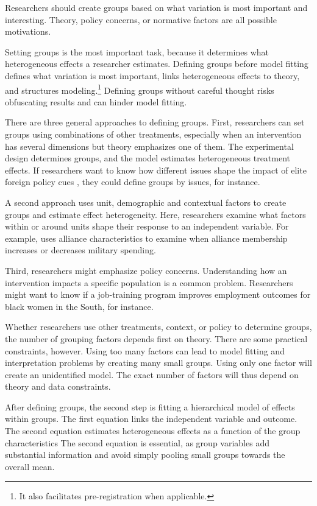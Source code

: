 \documentclass[12pt]{article}
\begin{document}
Researchers should create groups based on what variation is most important and interesting. 
Theory, policy concerns, or normative factors are all possible motivations. 


Setting groups is the most important task, because it determines what heterogeneous effects a researcher estimates. 
Defining groups before model fitting defines what variation is most important, links heterogeneous effects to theory, and structures modeling.\footnote{It also facilitates pre-registration when applicable.}
Defining groups without careful thought risks obfuscating results and can hinder model fitting.   


There are three general approaches to defining groups.  
First, researchers can set groups using combinations of other treatments, especially when an intervention has several dimensions but theory emphasizes one of them. 
The experimental design determines groups, and the model estimates heterogeneous treatment effects.   
If researchers want to know how different issues shape the impact of elite foreign policy cues \citep{GuisingerSaunders2017}, they could define groups by issues, for instance.


A second approach uses unit, demographic and contextual factors to create groups and estimate  effect heterogeneity. 
Here, researchers examine what factors within or around units shape their response to an independent variable.
For example, \citet{Alley2021isq} uses alliance characteristics to examine when alliance membership increases or decreases military spending.


Third, researchers might emphasize policy concerns.
Understanding how an intervention impacts a specific population is a common problem.
Researchers might want to know if a job-training program improves employment outcomes for black women in the South, for instance.  


Whether researchers use other treatments, context, or policy to determine groups, the number of grouping factors depends first on theory.
There are some practical constraints, however.
Using too many factors can lead to model fitting and interpretation problems by creating many small groups.
Using only one factor will create an unidentified model.
The exact number of factors will thus depend on theory and data constraints.  


After defining groups, the second step is fitting a hierarchical model of effects within groups.
The first equation links the independent variable and outcome.
The second equation estimates heterogeneous effects as a function of the group characteristics  
The second equation is essential, as group variables add substantial information and avoid simply pooling small groups towards the overall mean.
\end{document}
